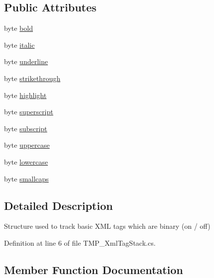 \subsection*{Public Attributes}
\begin{DoxyCompactItemize}
\item 
byte \mbox{\hyperlink{struct_t_m_pro_1_1_t_m_p___basic_xml_tag_stack_a4a430a9102bd1e8a2125297319a2cd11}{bold}}
\item 
byte \mbox{\hyperlink{struct_t_m_pro_1_1_t_m_p___basic_xml_tag_stack_a7a4b3a0dbe3b8a3919fdb95497bf0a1f}{italic}}
\item 
byte \mbox{\hyperlink{struct_t_m_pro_1_1_t_m_p___basic_xml_tag_stack_a6719da4dddf675308cd077d70843a1e7}{underline}}
\item 
byte \mbox{\hyperlink{struct_t_m_pro_1_1_t_m_p___basic_xml_tag_stack_a9137f5f5200ce9b4ce94176b46508eb3}{strikethrough}}
\item 
byte \mbox{\hyperlink{struct_t_m_pro_1_1_t_m_p___basic_xml_tag_stack_a0255c2e005328c8c98ecdb1a84a6b15a}{highlight}}
\item 
byte \mbox{\hyperlink{struct_t_m_pro_1_1_t_m_p___basic_xml_tag_stack_a6e883a6d5ae1594d0e748eb3ee65fa07}{superscript}}
\item 
byte \mbox{\hyperlink{struct_t_m_pro_1_1_t_m_p___basic_xml_tag_stack_a09d330494aa5aefda65daf8f02c9d98a}{subscript}}
\item 
byte \mbox{\hyperlink{struct_t_m_pro_1_1_t_m_p___basic_xml_tag_stack_a207b4f8ec865f6a09e3c176e207df869}{uppercase}}
\item 
byte \mbox{\hyperlink{struct_t_m_pro_1_1_t_m_p___basic_xml_tag_stack_a389292686fb1ba06bfe48c50e9057185}{lowercase}}
\item 
byte \mbox{\hyperlink{struct_t_m_pro_1_1_t_m_p___basic_xml_tag_stack_a1902e27b99936d5625b338540d1d5884}{smallcaps}}
\end{DoxyCompactItemize}


\subsection{Detailed Description}
Structure used to track basic X\+ML tags which are binary (on / off) 



Definition at line 6 of file T\+M\+P\+\_\+\+Xml\+Tag\+Stack.\+cs.



\subsection{Member Function Documentation}
\mbox{\label{struct_t_m_pro_1_1_t_m_p___basic_xml_tag_stack_a783f33bfcbeaa7cd8ca00fa7f90c8b37}} 
